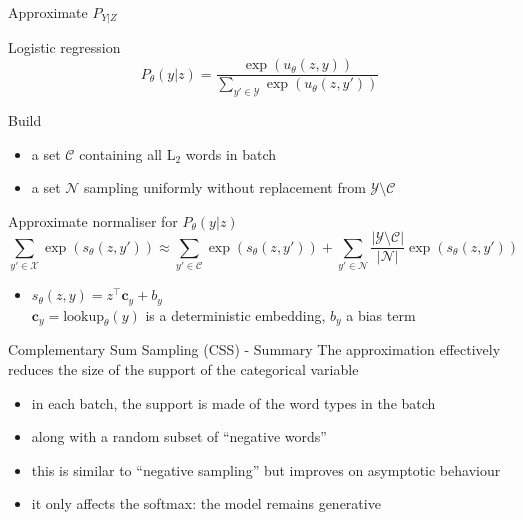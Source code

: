 \begin{frame}{Approximate $P_{Y|Z}$}

Logistic regression
\begin{equation*}
P_\theta(y|z) = \frac{\exp(u_\theta(z, y))}{\sum_{y'\in \mathcal Y} \exp(u_\theta(z, y'))}
\end{equation*}

\pause

Build
\begin{itemize}
	\item a set $\mathcal C$ containing all L$_2$ words in batch
	\item a set $\mathcal N$ sampling uniformly without replacement from $\mathcal Y \setminus \mathcal C$
\end{itemize}

\pause 
Approximate normaliser for $P_\theta(y|z)$
\begin{equation*}
\sum_{y'\in \mathcal X} \exp(s_\theta(z, y')) \approx \sum_{y'\in \mathcal C} \exp(s_\theta(z, y')) + \sum_{y'\in \mathcal N} \frac{|\mathcal Y \setminus \mathcal C|}{|\mathcal N|}\exp(s_\theta(z, y'))
\end{equation*}
\begin{itemize}
	\item $s_\theta(z, y) = z^\top \mathbf c_y + b_y$ \\
	$\mathbf c_y = \text{lookup}_\theta(y)$ is a deterministic embedding, $b_y$ a bias term
\end{itemize}

\end{frame}

\begin{frame}{Complementary Sum Sampling (CSS) - Summary}
The approximation effectively reduces the size of the support of the categorical variable
\begin{itemize}
	\item in each batch, the support is made of the word types in the batch
	\item along with a random subset of ``negative words''
	\item this is similar to ``negative sampling'' but improves on asymptotic behaviour
	\item it only affects the softmax: the model remains generative
\end{itemize}

\end{frame}

